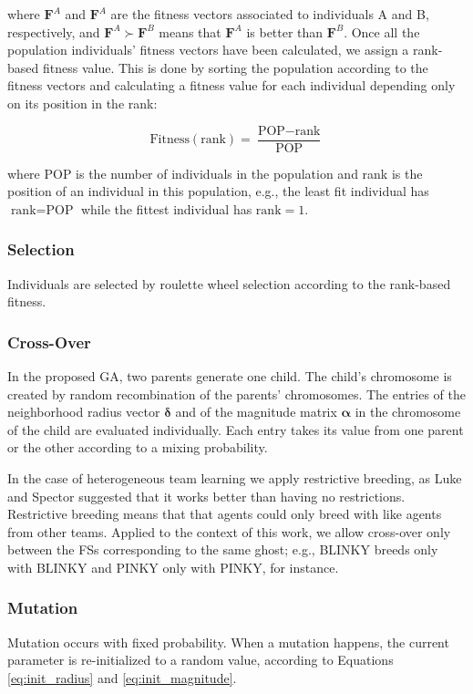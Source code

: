 \documentclass[journal]{IEEEtran}
\begin{document}
where $\mathbf{F}^A$ and $\mathbf{F}^A$ are the fitness vectors associated to individuals A and B, respectively, and $\mathbf{F}^A \succ \mathbf{F}^B$ means that $\mathbf{F}^A$ is better than $\mathbf{F}^B$. Once all the population individuals' fitness vectors have been calculated, we assign a rank-based fitness value. This is done by sorting the population according to the fitness vectors and calculating a fitness value for each individual depending only on its position in the rank:

\begin{equation}
\label{eq:rankFitness}
	\text{Fitness}(\text{rank}) = \frac{\text{POP} - \text{rank}}{\text{POP}}
\end{equation}

where POP is the number of individuals in the population and rank is the position of an individual in this population, e.g., the least fit individual has $\text{rank} = \text{POP}$ while the fittest individual has $\text{rank} = 1$.

\subsubsection{Selection}
Individuals are selected by roulette wheel selection according to the rank-based fitness.

\subsubsection{Cross-Over}
In the proposed GA, two parents generate one child. The child's chromosome is created by random recombination of the parents' chromosomes. The entries of the neighborhood radius vector $\boldsymbol\delta$ and of the magnitude matrix $\boldsymbol\alpha$ in the chromosome of the child are evaluated individually. Each entry takes its value from one parent or the other according to a mixing probability.

In the case of heterogeneous team learning we apply restrictive
breeding, as Luke and Spector \cite{Luke1996} suggested that it works
better than having no restrictions. Restrictive breeding means that
that agents could only breed with like agents from other
teams. Applied to the context of this work, we allow cross-over only
between the FSs corresponding to the same ghost; e.g., BLINKY breeds
only with BLINKY and PINKY only with PINKY, for instance.

\subsubsection{Mutation}
Mutation occurs with fixed probability. When a mutation happens, the current parameter is re-initialized to a random value, according to Equations \eqref{eq:init_radius} and \eqref{eq:init_magnitude}.
\end{document}
